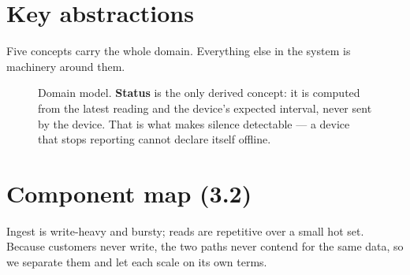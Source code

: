 \documentclass[11pt,a4paper]{article}
\begin{document}
\section{Key abstractions}

Five concepts carry the whole domain. Everything else in the system is machinery
around them.

\begin{figure}[H]
\centering
{}
\caption{Domain model. \textbf{Status} is the only derived concept: it is computed
from the latest reading and the device's expected interval, never sent by the device.
That is what makes silence detectable --- a device that stops reporting cannot
declare itself offline.}
\end{figure}

\section{Component map (3.2)}

Ingest is write-heavy and bursty; reads are repetitive over a small hot set. Because
customers never write, the two paths never contend for the same data, so we separate
them and let each scale on its own terms.
\end{document}
